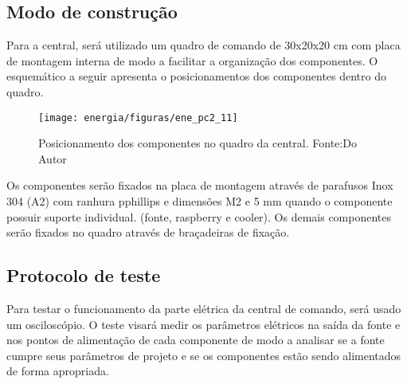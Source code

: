 \subsection{Modo de construção}

Para a central, será utilizado um quadro de comando de 30x20x20 cm com placa de montagem interna de modo a facilitar a organização dos componentes. O esquemático a seguir apresenta o posicionamentos dos componentes dentro do quadro.

\begin{figure}[H]
		\centering
		\texttt{[image: energia/figuras/ene\_pc2\_11]}
		\caption{Posicionamento dos componentes no quadro da central. Fonte:Do Autor}
		\label{ene_pc2_11}
\end{figure}

Os componentes serão fixados na placa de montagem através de parafusos Inox 304 (A2) com ranhura pphillips e dimensões M2 e 5 mm quando o componente possuir suporte individual. (fonte, raspberry e cooler). Os demais componentes serão fixados no quadro através de braçadeiras de fixação.

\subsection{Protocolo de teste}

Para testar o funcionamento da parte elétrica da central de comando, será usado um osciloscópio. O teste visará medir os parâmetros elétricos na saída da fonte e nos pontos de alimentação de cada componente de modo a analisar se a fonte cumpre seus parâmetros de projeto e se os componentes estão sendo alimentados de forma apropriada.